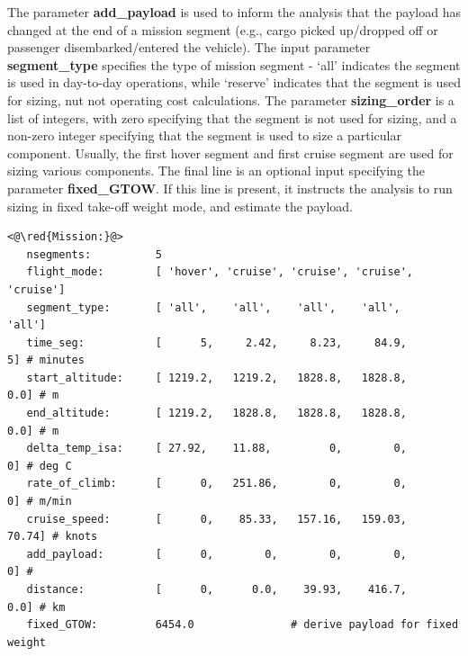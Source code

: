 The parameter \textbf{add\_payload} is used to inform the analysis that the payload has changed at the end of a mission segment (e.g., cargo picked up/dropped off or passenger disembarked/entered the vehicle). The input parameter \textbf{segment\_type} specifies the type of mission segment - `all' indicates the segment is used in day-to-day operations, while `reserve' indicates that the segment is used for sizing, nut not operating cost calculations. The parameter \textbf{sizing\_order} is a list of integers, with zero specifying that the segment is not used for sizing, and a non-zero integer specifying that the segment is used to size a particular component. Usually, the first hover segment and first cruise segment are used for sizing various components. The final line is an optional input specifying the parameter \textbf{fixed\_GTOW}. If this line is present, it instructs the analysis to run sizing in fixed take-off weight mode, and estimate the payload.

\begin{lstlisting}
<@\red{Mission:}@>
   nsegments:          5
   flight_mode:        [ 'hover', 'cruise', 'cruise', 'cruise', 'cruise'] 
   segment_type:       [ 'all',    'all',    'all',    'all',    'all'] 
   time_seg:           [      5,     2.42,     8.23,     84.9,        5] # minutes
   start_altitude:     [ 1219.2,   1219.2,   1828.8,   1828.8,      0.0] # m
   end_altitude:       [ 1219.2,   1828.8,   1828.8,   1828.8,      0.0] # m
   delta_temp_isa:     [ 27.92,    11.88,         0,        0,        0] # deg C
   rate_of_climb:      [      0,   251.86,        0,        0,        0] # m/min
   cruise_speed:       [      0,    85.33,   157.16,   159.03,    70.74] # knots
   add_payload:        [      0,        0,        0,        0,        0] # 
   distance:           [      0,      0.0,    39.93,    416.7,      0.0] # km
   fixed_GTOW:         6454.0               # derive payload for fixed weight
\end{lstlisting}

